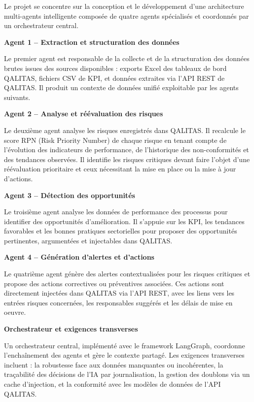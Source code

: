 Le projet se concentre sur la conception et le développement d'une architecture multi-agents intelligente composée de quatre agents spécialisés et coordonnés par un orchestrateur central.

\vspace{0.5em}
\noindent\textbf{Agent 1 -- Extraction et structuration des données}

Le premier agent est responsable de la collecte et de la structuration des données brutes issues des sources disponibles : exports Excel des tableaux de bord QALITAS, fichiers CSV de KPI, et données extraites via l'API REST de QALITAS. Il produit un contexte de données unifié exploitable par les agents suivants.

\vspace{0.5em}
\noindent\textbf{Agent 2 -- Analyse et réévaluation des risques}

Le deuxième agent analyse les risques enregistrés dans QALITAS. Il recalcule le score RPN (Risk Priority Number) de chaque risque en tenant compte de l'évolution des indicateurs de performance, de l'historique des non-conformités et des tendances observées. Il identifie les risques critiques devant faire l'objet d'une réévaluation prioritaire et ceux nécessitant la mise en place ou la mise à jour d'actions.

\vspace{0.5em}
\noindent\textbf{Agent 3 -- Détection des opportunités}

Le troisième agent analyse les données de performance des processus pour identifier des opportunités d'amélioration. Il s'appuie sur les KPI, les tendances favorables et les bonnes pratiques sectorielles pour proposer des opportunités pertinentes, argumentées et injectables dans QALITAS.

\vspace{0.5em}
\noindent\textbf{Agent 4 -- Génération d'alertes et d'actions}

Le quatrième agent génère des alertes contextualisées pour les risques critiques et propose des actions correctives ou préventives associées. Ces actions sont directement injectées dans QALITAS via l'API REST, avec les liens vers les entrées risques concernées, les responsables suggérés et les délais de mise en oeuvre.

\vspace{0.5em}
\noindent\textbf{Orchestrateur et exigences transverses}

Un orchestrateur central, implémenté avec le framework LangGraph, coordonne l'enchaînement des agents et gère le contexte partagé. Les exigences transverses incluent : la robustesse face aux données manquantes ou incohérentes, la traçabilité des décisions de l'IA par journalisation, la gestion des doublons via un cache d'injection, et la conformité avec les modèles de données de l'API QALITAS.

